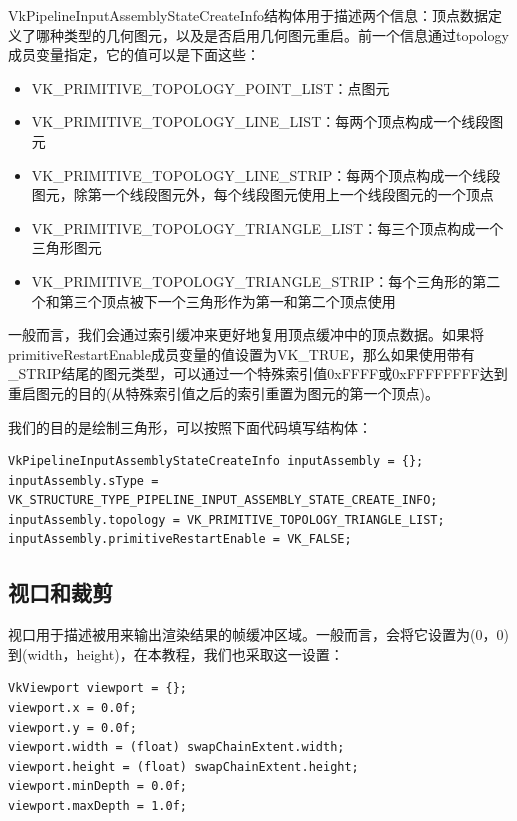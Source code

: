 \documentclass{ctexart}
\begin{document}
VkPipelineInputAssemblyStateCreateInfo结构体用于描述两个信息：顶点数据定义了哪种类型的几何图元，以及是否启用几何图元重启。前一个信息通过topology成员变量指定，它的值可以是下面这些：

\begin{itemize}
	\item VK\_PRIMITIVE\_TOPOLOGY\_POINT\_LIST：点图元
	\item VK\_PRIMITIVE\_TOPOLOGY\_LINE\_LIST：每两个顶点构成一个线段图元
	\item VK\_PRIMITIVE\_TOPOLOGY\_LINE\_STRIP：每两个顶点构成一个线段图元，除第一个线段图元外，每个线段图元使用上一个线段图元的一个顶点
	\item VK\_PRIMITIVE\_TOPOLOGY\_TRIANGLE\_LIST：每三个顶点构成一个三角形图元
	\item VK\_PRIMITIVE\_TOPOLOGY\_TRIANGLE\_STRIP：每个三角形的第二个和第三个顶点被下一个三角形作为第一和第二个顶点使用
\end{itemize}

一般而言，我们会通过索引缓冲来更好地复用顶点缓冲中的顶点数据。如果将primitiveRestartEnable成员变量的值设置为VK\_TRUE，那么如果使用带有\_STRIP结尾的图元类型，可以通过一个特殊索引值0xFFFF或0xFFFFFFFF达到重启图元的目的(从特殊索引值之后的索引重置为图元的第一个顶点)。

我们的目的是绘制三角形，可以按照下面代码填写结构体：

\begin{lstlisting}[language={[ANSI]C}]
VkPipelineInputAssemblyStateCreateInfo inputAssembly = {};
inputAssembly.sType = VK_STRUCTURE_TYPE_PIPELINE_INPUT_ASSEMBLY_STATE_CREATE_INFO;
inputAssembly.topology = VK_PRIMITIVE_TOPOLOGY_TRIANGLE_LIST;
inputAssembly.primitiveRestartEnable = VK_FALSE;
\end{lstlisting}

\subsection{视口和裁剪}

视口用于描述被用来输出渲染结果的帧缓冲区域。一般而言，会将它设置为(0，0)到(width，height)，在本教程，我们也采取这一设置：

\begin{lstlisting}[language={[ANSI]C}]
VkViewport viewport = {};
viewport.x = 0.0f;
viewport.y = 0.0f;
viewport.width = (float) swapChainExtent.width;
viewport.height = (float) swapChainExtent.height;
viewport.minDepth = 0.0f;
viewport.maxDepth = 1.0f;
\end{lstlisting}
\end{document}
